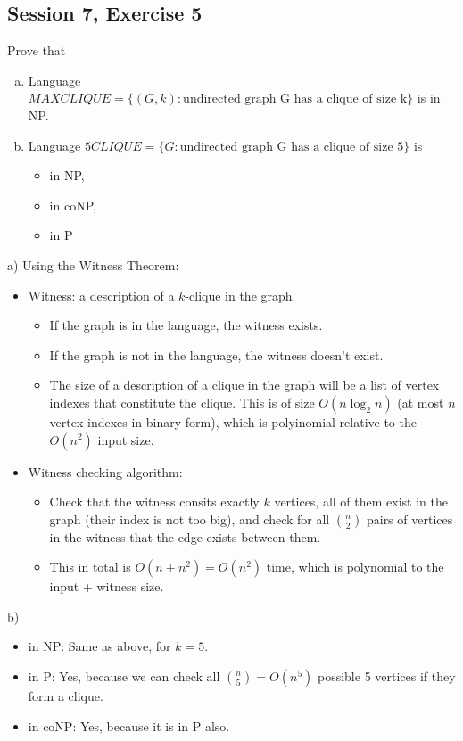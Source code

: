 \subsection {Session 7, Exercise 5}


Prove that
\begin{enumerate}[a)]
\item Language $MAXCLIQUE = \{(G,k) : \text{undirected graph G has a clique of size k}\}$ is in NP.
\item Language $5CLIQUE = \{G : \text{undirected graph G has a clique of size 5}\}$ is
    \begin{itemize}
        \item in NP,
        \item in coNP,
        \item in P
    \end{itemize}
\end{enumerate}


a) Using the Witness Theorem:

\begin{itemize}
    \item Witness: a description of a $k$-clique in the graph.
    \begin{itemize}
        \item If the graph is in the language, the witness exists.
        \item If the graph is not in the language, the witness doesn't exist.
        \item The size of a description of a clique in the graph will be a list of vertex indexes that constitute the clique. This is of size $O(n\log_2n)$ (at most $n$ vertex indexes in binary form), which is polyinomial relative to the $O(n^2)$ input size.
    \end{itemize}
    \item Witness checking algorithm:
    \begin{itemize}
        \item Check that the witness consits exactly $k$ vertices, all of them exist in the graph (their index is not too big), and check for all $n\choose{}2$ pairs of vertices in the witness that the edge exists between them.
        \item This in total is $O(n+n^2) = O(n^2)$ time, which is polynomial to the input + witness size.
    \end{itemize}
\end{itemize}

b)

\begin{itemize}
    \item in NP: Same as above, for $k=5$.
    \item in P: Yes, because we can check all ${n\choose{}5} = O(n^5)$ possible 5 vertices if they form a clique.
    \item in coNP: Yes, because it is in P also.
\end{itemize}
